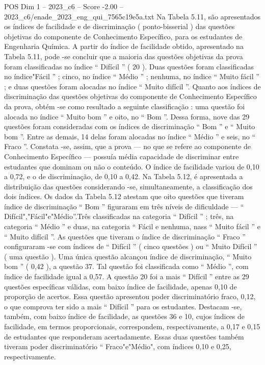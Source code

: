 \begin{textsample}{POS Dim 1 – 2023\_c6 – Score -2.00 – 2023\_c6/enade\_2023\_eng\_qui\_7565c19e5a.txt}
Na Tabela 5.11, são apresentados os índices de facilidade e de discriminação ( ponto-bisserial ) das questões objetivas do componente de Conhecimento Específico, para os estudantes de Engenharia Química.
A partir do índice de facilidade obtido, apresentado na Tabela 5.11, pode -se concluir que a maioria das questões objetivas da prova foram classificadas no índice “ Difícil ” ( 20 ).
Duas questões foram classificadas no índice"Fácil ” ; cinco, no índice “ Médio ” ; nenhuma, no índice “ Muito fácil ” ; e duas questões foram alocadas no índice “ Muito difícil ”.
Quanto aos índices de discriminação das questões objetivas do componente de Conhecimento Específico da prova, obtém -se como resultado a seguinte classificação : uma questão foi alocada no índice “ Muito bom ” e oito, no “ Bom ”.
Dessa forma, nove das 29 questões foram consideradas com os índices de discriminação “ Bom ” e “ Muito bom ”.
Entre as demais, 14 delas foram alocadas no índice “ Médio ” e seis, no “ Fraco ”.
Constata -se, assim, que a prova — no que se refere ao componente de Conhecimento Específico — possuía média capacidade de discriminar entre estudantes que dominam ou não o conteúdo.
O índice de facilidade variou de 0,10 a 0,72, e o de discriminação, de 0,10 a 0,42.
Na Tabela 5.12, é apresentada a distribuição das questões considerando -se, simultaneamente, a classificação dos dois índices.
Os dados da Tabela 5.12 atestam que oito questões que tiveram índice de discriminação “ Bom ” figuraram em três níveis de dificuldade — “ Difícil","Fácil"e"Médio”.Três classificadas na categoria “ Difícil ” ; três, na categoria “ Médio ” e duas, na categoria “ Fácil e nenhuma, nass “ Muito fácil ” e “ Muito difícil ”.
As questões que tiveram o índice de discriminação “ Fraco ” configuraram -se com índices de “ Difícil ” ( cinco questões ) ou “ Muito Difícil ” ( uma questão ).
Uma única questão alcançou índice de discriminação, “ Muito bom ” ( 0,42 ), a questão 37.
Tal questão foi classificada como “ Médio ”, com índice de facilidade igual a 0,57.
A questão 20 foi a mais “ Difícil ” entre as 29 questões específicas válidas, com baixo índice de facilidade, apenas 0,10 de proporção de acertos.
Essa questão apresentou poder discriminatório fraco, 0,12, o que comprova ter sido a mais “ Difícil ” para os estudantes.
Destacam -se, também, com baixo índice de facilidade, as questões 36 e 10, cujos índices de facilidade, em termos proporcionais, correspondem, respectivamente, a 0,17 e 0,15 de estudantes que responderam acertadamente.
Essas duas questões também tiveram poder discriminatório “ Fraco"e"Médio", com índices 0,10 e 0,25, respectivamente.

\end{textsample}
